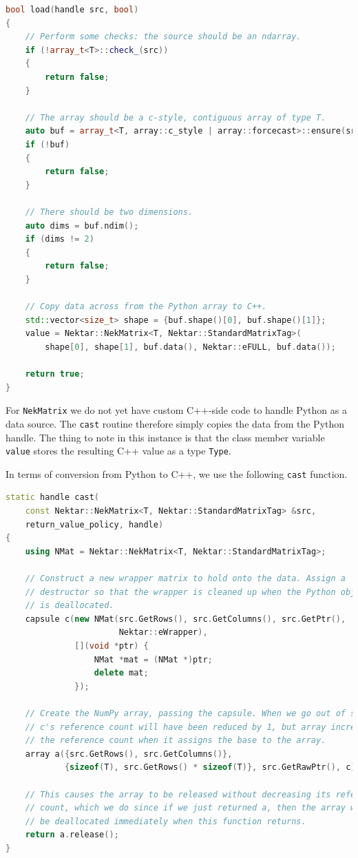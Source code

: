 \begin{lstlisting}[caption={Python to C++ converter for \texttt{NekMatrix}}, label={lst:c_to_python_load}, language=C++]
bool load(handle src, bool)
{
    // Perform some checks: the source should be an ndarray.
    if (!array_t<T>::check_(src))
    {
        return false;
    }

    // The array should be a c-style, contiguous array of type T.
    auto buf = array_t<T, array::c_style | array::forcecast>::ensure(src);
    if (!buf)
    {
        return false;
    }

    // There should be two dimensions.
    auto dims = buf.ndim();
    if (dims != 2)
    {
        return false;
    }

    // Copy data across from the Python array to C++.
    std::vector<size_t> shape = {buf.shape()[0], buf.shape()[1]};
    value = Nektar::NekMatrix<T, Nektar::StandardMatrixTag>(
        shape[0], shape[1], buf.data(), Nektar::eFULL, buf.data());

    return true;
}
\end{lstlisting}

For \texttt{NekMatrix} we do not yet have custom C++-side code to handle Python as
a data source. The \texttt{cast} routine therefore simply copies the data from the
Python handle. The thing to note in this instance is that the class member
variable \texttt{value} stores the resulting C++ value as a type \texttt{Type}.

In terms of conversion from Python to C++, we use the following \texttt{cast}
function.

\begin{lstlisting}[caption={C++ to Python converter for \texttt{NekMatrix}}, label={lst:c_to_python_load}, language=C++]
static handle cast(
    const Nektar::NekMatrix<T, Nektar::StandardMatrixTag> &src,
    return_value_policy, handle)
{
    using NMat = Nektar::NekMatrix<T, Nektar::StandardMatrixTag>;

    // Construct a new wrapper matrix to hold onto the data. Assign a
    // destructor so that the wrapper is cleaned up when the Python object
    // is deallocated.
    capsule c(new NMat(src.GetRows(), src.GetColumns(), src.GetPtr(),
                       Nektar::eWrapper),
              [](void *ptr) {
                  NMat *mat = (NMat *)ptr;
                  delete mat;
              });

    // Create the NumPy array, passing the capsule. When we go out of scope,
    // c's reference count will have been reduced by 1, but array increases
    // the reference count when it assigns the base to the array.
    array a({src.GetRows(), src.GetColumns()},
            {sizeof(T), src.GetRows() * sizeof(T)}, src.GetRawPtr(), c);

    // This causes the array to be released without decreasing its reference
    // count, which we do since if we just returned a, then the array would
    // be deallocated immediately when this function returns.
    return a.release();
}
\end{lstlisting}

